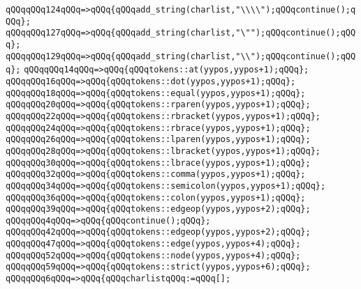 \verb|qQQqqQQq124qQQq=>qQQq{qQQqadd_string(charlist,"\\\\");qQQqcontinue();qQQq};|\newline
\verb|qQQqqQQq127qQQq=>qQQq{qQQqadd_string(charlist,"\"");qQQqcontinue();qQQq};|\newline
\verb|qQQqqQQq129qQQq=>qQQq{qQQqadd_string(charlist,"\\");qQQqcontinue();qQQq};|\newline
\verb|qQQqqQQq14qQQq=>qQQq{qQQqtokens::at(yypos,yypos+1);qQQq};|\newline
\verb|qQQqqQQq16qQQq=>qQQq{qQQqtokens::dot(yypos,yypos+1);qQQq};|\newline
\verb|qQQqqQQq18qQQq=>qQQq{qQQqtokens::equal(yypos,yypos+1);qQQq};|\newline
\verb|qQQqqQQq20qQQq=>qQQq{qQQqtokens::rparen(yypos,yypos+1);qQQq};|\newline
\verb|qQQqqQQq22qQQq=>qQQq{qQQqtokens::rbracket(yypos,yypos+1);qQQq};|\newline
\verb|qQQqqQQq24qQQq=>qQQq{qQQqtokens::rbrace(yypos,yypos+1);qQQq};|\newline
\verb|qQQqqQQq26qQQq=>qQQq{qQQqtokens::lparen(yypos,yypos+1);qQQq};|\newline
\verb|qQQqqQQq28qQQq=>qQQq{qQQqtokens::lbracket(yypos,yypos+1);qQQq};|\newline
\verb|qQQqqQQq30qQQq=>qQQq{qQQqtokens::lbrace(yypos,yypos+1);qQQq};|\newline
\verb|qQQqqQQq32qQQq=>qQQq{qQQqtokens::comma(yypos,yypos+1);qQQq};|\newline
\verb|qQQqqQQq34qQQq=>qQQq{qQQqtokens::semicolon(yypos,yypos+1);qQQq};|\newline
\verb|qQQqqQQq36qQQq=>qQQq{qQQqtokens::colon(yypos,yypos+1);qQQq};|\newline
\verb|qQQqqQQq39qQQq=>qQQq{qQQqtokens::edgeop(yypos,yypos+2);qQQq};|\newline
\verb|qQQqqQQq4qQQq=>qQQq{qQQqcontinue();qQQq};|\newline
\verb|qQQqqQQq42qQQq=>qQQq{qQQqtokens::edgeop(yypos,yypos+2);qQQq};|\newline
\verb|qQQqqQQq47qQQq=>qQQq{qQQqtokens::edge(yypos,yypos+4);qQQq};|\newline
\verb|qQQqqQQq52qQQq=>qQQq{qQQqtokens::node(yypos,yypos+4);qQQq};|\newline
\verb|qQQqqQQq59qQQq=>qQQq{qQQqtokens::strict(yypos,yypos+6);qQQq};|\newline
\verb|qQQqqQQq6qQQq=>qQQq{qQQqcharlistqQQq:=qQQq[];|\newline
